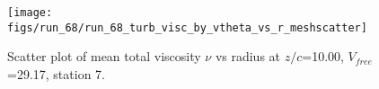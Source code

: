 \begin{figure}[H]
\centering
\texttt{[image: figs/run\_68/run\_68\_turb\_visc\_by\_vtheta\_vs\_r\_meshscatter]}
\caption{Scatter plot of mean total viscosity $\nu$ vs radius at $z/c$=10.00, $V_{free}$=29.17, station 7.}
\label{fig:run_68_turb_visc_by_vtheta_vs_r_meshscatter}
\end{figure}


